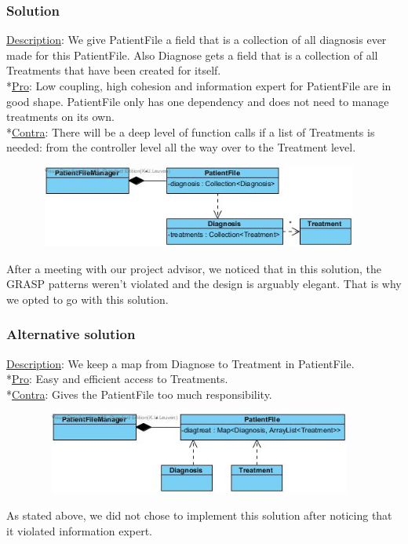 \documentclass[11pt]{article}
\begin{document}
\subsubsection{Solution}
\underline{Description}: We give PatientFile a field that is a collection of all diagnosis ever made for this PatientFile. Also Diagnose gets a field that is a collection of all Treatments that have been created for itself.
\\*\underline{Pro}: Low coupling, high cohesion and information expert for PatientFile are in good shape. PatientFile only has one dependency and does not need to manage treatments on its own.
\\*\underline{Contra}: There will be a deep level of function calls if a list of Treatments is needed: from the controller level all the way over to the Treatment level.
\begin{center}
\includegraphics[width=130mm, height=27mm]{patientfilediagwin.jpg}
\end{center}
After a meeting with our project advisor, we noticed that in this solution, the GRASP patterns weren’t violated and the design is arguably elegant. That is why we opted to go with this solution.

\subsubsection{Alternative solution}
\underline{Description}: We keep a map from Diagnose to Treatment in PatientFile.
\\*\underline{Pro}: Easy and efficient access to Treatments.
\\*\underline{Contra}: Gives the PatientFile too much responsibility.
\begin{center}
\includegraphics[width=130mm, height=27mm]{patientfilediagfail.jpg}
\end{center}
As stated above, we did not chose to implement this solution after noticing that it violated information expert.
\end{document}

